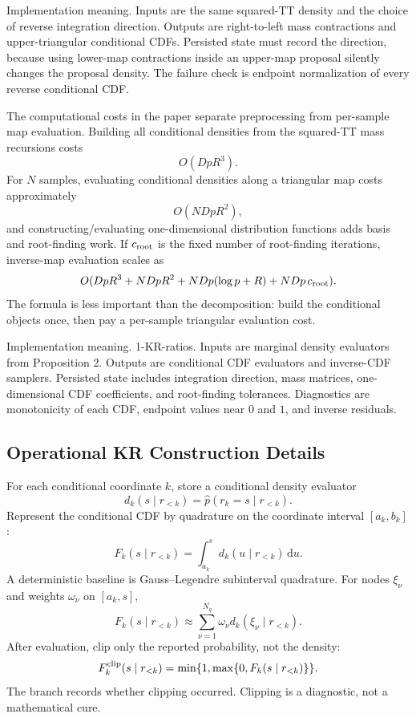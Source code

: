 \documentclass[11pt]{article}
\newcommand{\dd}{\,\mathrm d}
\begin{document}
Implementation meaning. Inputs are the same squared-TT density
and the choice of reverse integration direction.  Outputs are right-to-left
mass contractions and upper-triangular conditional CDFs.  Persisted state must
record the direction, because using lower-map contractions inside an upper-map
proposal silently changes the proposal density.  The failure check is endpoint
normalization of every reverse conditional CDF.

The computational costs in the paper separate preprocessing from per-sample
map evaluation.  Building all conditional densities from the squared-TT mass
recursions costs
\[
    O(DpR^3).
    \label{eq:p24-k9}
\]
For \(N\) samples, evaluating conditional densities along a triangular map
costs approximately
\[
    O(NDpR^2),
    \label{eq:p24-k10}
\]
and constructing/evaluating one-dimensional distribution functions adds basis
and root-finding work.  If \(c_{\rm root}\) is the fixed number of root-finding
iterations, inverse-map evaluation scales as
\[
    O(DpR^3+NDpR^2+NDp(\log p+R)+NDp\,c_{\rm root}).
    \label{eq:p24-k11}
\]
The formula is less important than the decomposition: build the conditional
objects once, then pay a per-sample triangular evaluation cost.

Implementation meaning. 1-KR-ratios.  Inputs are marginal density
evaluators from Proposition 2.  Outputs are conditional CDF evaluators and
inverse-CDF samplers.  Persisted state includes integration direction, mass
matrices, one-dimensional CDF coefficients, and root-finding tolerances.
Diagnostics are monotonicity of each CDF, endpoint values near \(0\) and \(1\),
and inverse residuals.

\subsection*{Operational KR Construction Details}

For each conditional coordinate \(k\), store a conditional density evaluator
\[
    d_k(s\mid r_{<k})
    =
    \widehat p(r_k=s\mid r_{<k}).
    \label{eq:p24-p23-krops1}
\]
Represent the conditional CDF by quadrature on the coordinate interval
\([a_k,b_k]\):
\[
    F_k(s\mid r_{<k})
    =
    \int_{a_k}^{s}d_k(u\mid r_{<k})\dd u.
    \label{eq:p24-p23-krops2}
\]
A deterministic baseline is Gauss--Legendre subinterval quadrature.  For nodes
\(\xi_\nu\) and weights \(\omega_\nu\) on \([a_k,s]\),
\[
    F_k(s\mid r_{<k})
    \approx
    \sum_{\nu=1}^{N_q}\omega_\nu d_k(\xi_\nu\mid r_{<k}).
    \label{eq:p24-p23-krops3}
\]
After evaluation, clip only the reported probability, not the density:
\[
    F_k^{\rm clip}(s\mid r_{<k})
    =
    \min\{1,\max\{0,F_k(s\mid r_{<k})\}\}.
    \label{eq:p24-p23-krops4}
\]
The branch records whether clipping occurred.  Clipping is a diagnostic, not a
mathematical cure.
\end{document}
